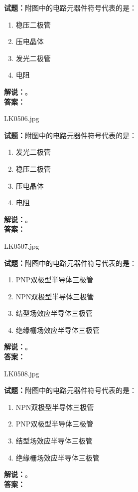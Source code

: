 \documentclass{ctexbook}
\begin{document}
\noindent\textbf{试题：}附图中的电路元器件符号代表的是：
\begin{enumerate}[leftmargin=3em]
  \item 稳压二极管
  \item 压电晶体
  \item 发光二极管
  \item 电阻
\end{enumerate}
\noindent\textbf{解说：}\textbf{}。\\\noindent\textbf{答案：}

\bigskip

LK0506.jpg

\noindent\textbf{试题：}附图中的电路元器件符号代表的是：
\begin{enumerate}[leftmargin=3em]
  \item 发光二极管
  \item 稳压二极管
  \item 压电晶体
  \item 电阻
\end{enumerate}
\noindent\textbf{解说：}\textbf{}。\\\noindent\textbf{答案：}

\bigskip

LK0507.jpg

\noindent\textbf{试题：}附图中的电路元器件符号代表的是：
\begin{enumerate}[leftmargin=3em]
  \item PNP双极型半导体三极管
  \item NPN双极型半导体三极管
  \item 结型场效应半导体三极管
  \item 绝缘栅场效应半导体三极管
\end{enumerate}
\noindent\textbf{解说：}\textbf{}。\\\noindent\textbf{答案：}

\bigskip

LK0508.jpg

\noindent\textbf{试题：}附图中的电路元器件符号代表的是：
\begin{enumerate}[leftmargin=3em]
  \item NPN双极型半导体三极管
  \item PNP双极型半导体三极管
  \item 结型场效应半导体三极管
  \item 绝缘栅场效应半导体三极管
\end{enumerate}
\noindent\textbf{解说：}\textbf{}。\\\noindent\textbf{答案：}
\end{document}
